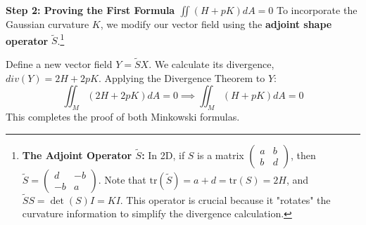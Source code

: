 \begin{solution}
\textbf{Step 2: Proving the First Formula $\iint (H + pK) dA = 0$}
To incorporate the Gaussian curvature $K$, we modify our vector field using the \textbf{adjoint shape operator} $\tilde{S}$.\footnote{\textbf{The Adjoint Operator $\tilde{S}$:} In 2D, if $S$ is a matrix $\begin{pmatrix} a & b \\ b & d \end{pmatrix}$, then $\tilde{S} = \begin{pmatrix} d & -b \\ -b & a \end{pmatrix}$. Note that $\text{tr}(\tilde{S}) = a+d = \text{tr}(S) = 2H$, and $\tilde{S} S = \det(S) I = K I$. This operator is crucial because it "rotates" the curvature information to simplify the divergence calculation.}

Define a new vector field $Y = \tilde{S} X$. We calculate its divergence, $div(Y) = 2H + 2pK$.
Applying the Divergence Theorem to $Y$:
\[ \iint_M (2H + 2pK) dA = 0 \implies \iint_M (H + pK) dA = 0 \]
This completes the proof of both Minkowski formulas.
\end{solution}

\clearpage

